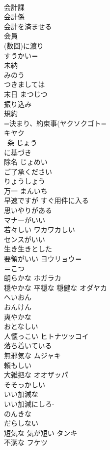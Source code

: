 \documentclass[8pt]{extreport}
\begin{document}
\begin{CJK}{UTF8}{min}
\\	会計課 
\\	会計係 
\\	会計を済ませる
\\	会員	
\\	(数回)に渡り	
\\	すうかい＝
\\	未納	
\\	みのう
\\	つきましては	
\\	末日	まつじつ 
\\	振り込み	
\\	規約	
\\	=決まり、約束事(ヤクソクゴト=
\\	キヤク
\\	~条	じょう 
\\	に基づき	
\\	除名	じょめい 
\\	ご了承ください	
\\	りょうしょう
\\	万一	まんいち 
\\	早速ですが	すぐ用件に入る
\\	思いやりがある	
\\	マナーがいい	
\\	若々しい	ワカワカしい 
\\	センスがいい	
\\	生き生きとした	
\\	要領がいい	ヨウリョウ＝
\\	＝こつ 
\\	朗らかな	ホガラカ 
\\	穏やかな 平穏な 穏健な	オダヤカ
\\	へいおん
\\	おんけん 
\\	爽やかな	
\\	おとなしい	
\\	人懐っこい	ヒトナツッコイ 
\\	落ち着いている	
\\	無邪気な	ムジャキ 
\\	頼もしい	
\\	大雑把な	オオザッパ
\\	そそっかしい	
\\	いい加減な	
\\	いい加減にしろ-
\\	のんきな	
\\	だらしない	
\\	短気な 気が短い	タンキ 
\\	不潔な	フケツ 

\end{CJK}
\end{document}

